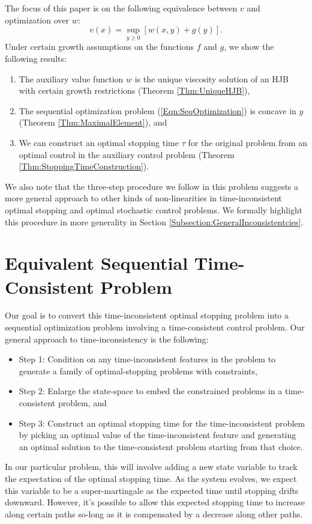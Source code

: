 \documentclass[11pt]{article}
\begin{document}
The focus of this paper is on the following equivalence between $v$ and optimization over $w$:
\begin{equation}\label{Eqn:SeqOptimization}
v(x) = \sup\limits_{y\geq 0}\left[w(x,y) + g(y)\right].
\end{equation}
Under certain growth assumptions on the functions $f$ and $g$, we show the following results:
\begin{enumerate}
\item The auxiliary value function $w$ is the unique viscosity solution of an HJB with certain growth restrictions (Theorem \ref{Thm:UniqueHJB}),
\item The sequential optimization problem (\ref{Eqn:SeqOptimization}) is concave in $y$ (Theorem \ref{Thm:MaximalElement}), and
\item We can construct an optimal stopping time $\tau$ for the original problem from an optimal control in the auxiliary control problem (Theorem \ref{Thm:StoppingTimeConstruction}).
\end{enumerate}
We also note that the three-step procedure we follow in this problem suggests a more general approach to other kinds of non-linearities in time-inconsistent optimal stopping and optimal stochastic control problems. We formally highlight this procedure in more generality in Section \ref{Subsection:GeneralInconsistentcies}.

\section{Equivalent Sequential Time-Consistent Problem}\label{Section:EquivalentProblem}

Our goal is to convert this time-inconsistent optimal stopping problem into a sequential optimization problem involving a time-consistent control problem. Our general approach to time-inconsistency is the following:
\begin{itemize}
\item Step 1: Condition on any time-inconsistent features in the problem to generate a family of optimal-stopping problems with constraints,
\item Step 2: Enlarge the state-space to embed the constrained problems in a time-consistent problem, and
\item Step 3: Construct an optimal stopping time for the time-inconsistent problem by picking an optimal value of the time-inconsistent feature and generating an optimal solution to the time-consistent problem starting from that choice.
\end{itemize} 
In our particular problem, this will involve adding a new state variable to track the expectation of the optimal stopping time. As the system evolves, we expect this variable to be a super-martingale as the expected time until stopping drifts downward. However, it's possible to allow this expected stopping time to increase along certain paths so-long as it is compensated by a decrease along other paths.
\end{document}
